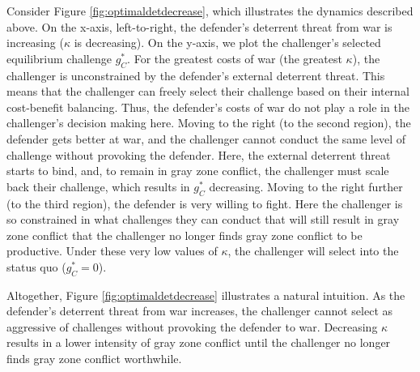 \documentclass[11pt,letterpaper,pdftex,dvipsnames,table]{article}
\begin{document}
Consider Figure \ref{fig:optimaldetdecrease}, which illustrates the dynamics described above. On the x-axis, left-to-right, the defender's deterrent threat from war is increasing ($\kappa$ is decreasing). On the y-axis, we plot the challenger's selected equilibrium challenge $g_{C}^{*}$. For the greatest costs of war (the greatest $\kappa$), the challenger is unconstrained by the defender's external deterrent threat. This means that the challenger can freely select their challenge based on their internal cost-benefit balancing. Thus, the defender's costs of war do not play a role in the challenger's decision making here. Moving to the right (to the second region), the defender gets better at war, and the challenger cannot conduct the same level of challenge without provoking the defender. Here, the external deterrent threat starts to bind, and, to remain in gray zone conflict, the challenger must scale back their challenge, which results in $g_{C}^{*}$ decreasing. Moving to the right further (to the third region), the defender is very willing to fight. Here the challenger is so constrained in what challenges they can conduct that will still result in gray zone conflict that the challenger no longer finds gray zone conflict to be productive. Under these very low values of $\kappa$, the challenger will select into the status quo ($g_C^*=0$).

Altogether, Figure \ref{fig:optimaldetdecrease} illustrates a natural intuition. As the defender's deterrent threat from war increases, the challenger cannot select as aggressive of challenges without provoking the defender to war. Decreasing $\kappa$ results in a lower intensity of gray zone conflict until the challenger no longer finds gray zone conflict worthwhile.
\end{document}
